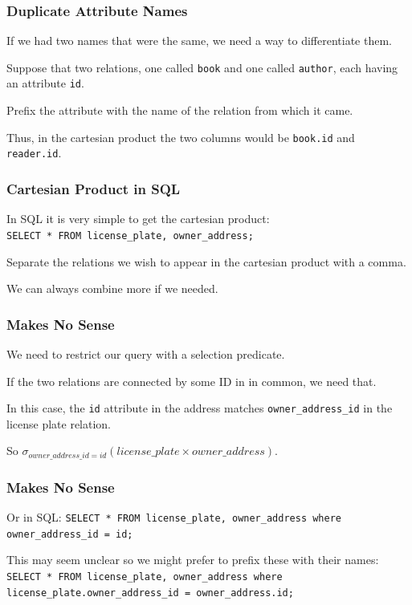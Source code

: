 \begin{frame}
\frametitle{Duplicate Attribute Names}

If we had two names that were the same, we need a way to differentiate them. 

Suppose that two relations, one called \texttt{book} and one called \texttt{author}, each having an attribute \texttt{id}. 

Prefix the attribute with the name of the relation from which it came. 

Thus, in the cartesian product the two columns would be \texttt{book.id} and \texttt{reader.id}.


\end{frame}



\begin{frame}
\frametitle{Cartesian Product in SQL}

In SQL it is very simple to get the cartesian product:\\
\texttt{SELECT * FROM license\_plate, owner\_address;} 

Separate the relations we wish to appear in the cartesian product with a comma.

We can always combine more if we needed.

\end{frame}



\begin{frame}
\frametitle{Makes No Sense}

We need to restrict our query with a selection predicate. 

If the two relations are connected by some ID in in common, we need that. 

In this case, the \texttt{id} attribute in the address matches \texttt{owner\_address\_id} in the license plate relation. 

So $\sigma_{owner\_address\_id = id}( license\_plate \times owner\_address )$.

\end{frame}

\begin{frame}
\frametitle{Makes No Sense}

Or in SQL: \texttt{SELECT * FROM license\_plate, owner\_address where owner\_address\_id = id;} 

This may seem unclear so we might prefer to prefix these with their names: \texttt{SELECT * FROM license\_plate, owner\_address where license\_plate.owner\_address\_id = owner\_address.id;} 


\end{frame}



